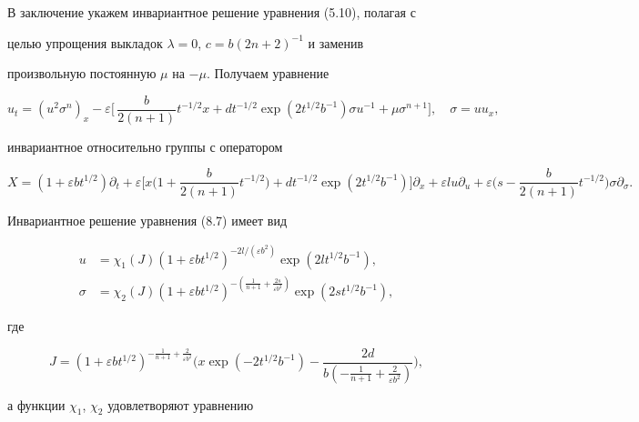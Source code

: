 В заключение укажем инвариантное решение уравнения (5.10), полагая с


целью упрощения выкладок $\lambda=0$, $c=b(2n+2)^{-1}$ и заменив


произвольную постоянную $\mu$ на $-\mu$. Получаем уравнение


\begin{equation}


u_t=(u^2\sigma^n)_x-\varepsilon\biggl[\,


\frac{b}{2(n+1)}t^{-1/2}x+dt^{-1/2}\exp(2t^{1/2}b^{-1})


\sigma u^{-1}+\mu\sigma^{n+1}\biggr],\quad \sigma=uu_x,


\end{equation}


инвариантное относительно группы с оператором


$$


X=(1+\varepsilon bt^{1/2})\partial_t+\varepsilon\biggl[ x


\biggl(1+\frac{b}{2(n+1)}t^{-1/2}\biggr)+dt^{-1/2}\exp


(2t^{1/2}b^{-1})\biggr]\partial_x+


\varepsilon lu\partial_u+\varepsilon


\biggl(s-\frac{b}{2(n+1)}t^{-1/2}\biggr)\sigma\partial_\sigma.


$$


Инвариантное решение уравнения (8.7) имеет вид


\begin{align*}


u&=\chi_1(J)(1+\varepsilon bt^{1/2})^{-2l/(\varepsilon b^2)}


\exp(2lt^{1/2}b^{-1}),\\


\sigma&=\chi_2(J)(1+\varepsilon


bt^{1/2})^{-(\frac{1}{n+1}+\frac{2s}{\varepsilon b^2})}


\exp(2st^{1/2}b^{-1}),


\end{align*}


где


$$


J=(1+\varepsilon bt^{1/2})^{-\frac{1}{n+1}+


\frac{2}{\varepsilon b^2}}\biggl(x\exp(-2t^{1/2}b^{-1})-


\frac{2d}{b(-\frac{1}{n+1}+\frac{2}{\varepsilon b^2})}\biggr),


$$


а функции $\chi_1$, $\chi_2$ удовлетворяют уравнению


